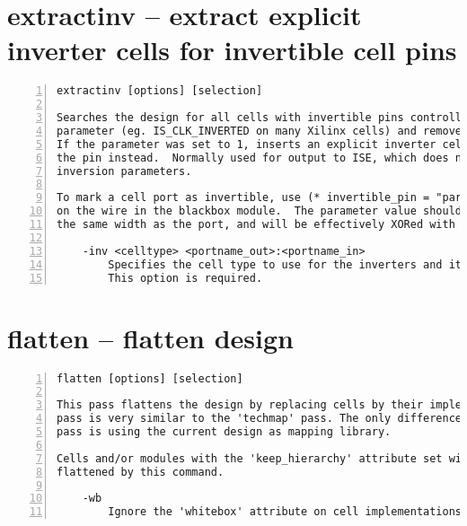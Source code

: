 \section{extractinv -- extract explicit inverter cells for invertible cell pins}
\label{cmd:extractinv}
\begin{lstlisting}[numbers=left,frame=single]
    extractinv [options] [selection]

Searches the design for all cells with invertible pins controlled by a cell
parameter (eg. IS_CLK_INVERTED on many Xilinx cells) and removes the parameter.
If the parameter was set to 1, inserts an explicit inverter cell in front of
the pin instead.  Normally used for output to ISE, which does not support the
inversion parameters.

To mark a cell port as invertible, use (* invertible_pin = "param_name" *)
on the wire in the blackbox module.  The parameter value should have
the same width as the port, and will be effectively XORed with it.

    -inv <celltype> <portname_out>:<portname_in>
        Specifies the cell type to use for the inverters and its port names.
        This option is required.
\end{lstlisting}

\section{flatten -- flatten design}
\label{cmd:flatten}
\begin{lstlisting}[numbers=left,frame=single]
    flatten [options] [selection]

This pass flattens the design by replacing cells by their implementation. This
pass is very similar to the 'techmap' pass. The only difference is that this
pass is using the current design as mapping library.

Cells and/or modules with the 'keep_hierarchy' attribute set will not be
flattened by this command.

    -wb
        Ignore the 'whitebox' attribute on cell implementations.
\end{lstlisting}

